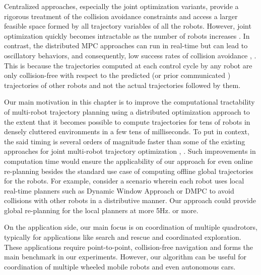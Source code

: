 Centralized approaches, especially the joint optimization variants, provide a rigorous treatment of the collision avoidance constraints and access a larger feasible space formed by all trajectory variables of all the robots. However, joint optimization quickly becomes intractable as the number of robots increases \citep{chen2015decoupled}. In contrast, the distributed MPC approaches can run in real-time but can lead to oscillatory behaviors, and consequently, low success rates of collision avoidance \citep{dmpc_carlos}, \citep{dmpc_carlos_2}. This is because the trajectories computed at each control cycle by any robot are only collision-free with respect to the predicted (or prior communicated ) trajectories of other robots and not the actual trajectories followed by them. 

Our main motivation in this chapter is to improve the computational tractability of multi-robot trajectory planning using a distributed optimization approach to the extent that it becomes possible to compute trajectories for tens of robots in densely cluttered environments in a few tens of milliseconds. To put in context, the said timing is several orders of magnitude faster than some of the existing approaches for joint multi-robot trajectory optimization \citep{rafaella_scp}, \citep{alonso_mora_nips_multi}. Such improvements in computation time would ensure the applicability of our approach for even online re-planning besides the standard use case of computing offline global trajectories for the robots. For example, consider a scenario wherein each robot uses local real-time planners such as Dynamic Window Approach \citep{dwa} or DMPC \citep{dmpc_carlos} to avoid collisions with other robots in a distributive manner. Our approach could provide global re-planning for the local planners at more 5Hz. or more.

On the application side, our main focus is on coordination of multiple quadrotors, typically for applications like search and rescue and coordinated exploration. These applications require point-to-point, collision-free navigation and forms the main benchmark in our experiments. However, our algorithm can be useful for coordination of multiple wheeled mobile robots and even autonomous cars.











